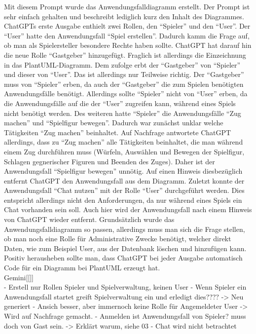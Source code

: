 Mit diesem Prompt wurde das Anwendungsfalldiagramm erstellt. Der Prompt ist sehr einfach gehalten und beschreibt lediglich kurz den Inhalt des Diagrammes.\\

ChatGPTs erste Ausgabe enthielt zwei Rollen, den ``Spieler'' und den ``User''. Der ``User'' hatte den Anwendungsfall ``Spiel erstellen''. Dadurch kamm die 
Frage auf, ob man als Spielersteller besondere Rechte haben sollte. ChatGPT hat darauf hin die neue Rolle ``Gastgeber'' hinzugefügt. Fraglich ist allerdings
die Einzeichnung in das PlantUML-Diagramm. Dem zufolge erbt der ``Gastgeber'' von ``Spieler'' und dieser von ``User''. Das ist allerdings nur Teilweise richtig.
Der ``Gastgeber'' muss von ``Spieler'' erben, da auch der ``Gastgeber'' die zum Spielen benötigten Anwendungsfälle benötigt. Allerdings sollte ``Spieler'' nicht 
von ``User'' erben, da die Anwendungsfälle auf die der ``User'' zugreifen kann, während eines Spiels nicht benötigt werden. Des weiteren hatte ``Spieler'' die 
Anwendungsfälle ``Zug machen'' und ``Spielfigur bewegen''. Dadurch war zunächst unklar welche Tätigkeiten ``Zug machen'' beinhaltet. Auf Nachfrage antwortete 
ChatGPT allerdings, dass zu ``Zug machen'' alle Tätigkeiten beinhaltet, die man während einem Zug durchführen muss (Würfeln, Auswählen und Bewegen der Spielfigur, 
Schlagen gegnerischer Figuren und Beenden des Zuges). Daher ist der Anwendungsfall ``Spielfigur bewegen'' unnötig. Auf einen Hinweis diesbezüglich entfernt ChatGPT 
den Anwendungsfall aus dem Diagramm. Zuletzt konnte der Anwendungsfall ``Chat nutzen'' mit der Rolle ``User'' durchgeführt werden. Dies entspricht allerdings nicht 
den Anforderungen, da nur während eines Spiels ein Chat vorhanden sein soll. Auch hier wird der Anwendungsfall nach einem Hinweis von ChatGPT wieder entfernt. 
Grundsätzlich wurde das Anwendungsfalldiagramm so passen, allerdings muss man sich die Frage stellen, ob man noch eine Rolle für Administrative Zwecke benötigt, 
welcher direkt Daten, wie zum Beispiel User, aus der Datenbank löschen und hinzufügen kann. Positiv herausheben sollte man, dass ChatGPT bei jeder Ausgabe 
automatisch Code für ein Diagramm bei PlantUML erzeugt hat.\\

Gemini[[]]\\
    - Erstell nur Rollen Spieler und Spielverwaltung, keinen User
    - Wenn Spieler ein Anwendungsfall startet greift Spielverwaltung ein und erledigt dies????
    -> Neu generiert
    - Ansich besser, aber immernoch keine Rolle für Angemeldeter User -> Wird auf Nachfrage gemacht.
    - Anmelden ist Anwendungsfall von Spieler? muss doch von Gast sein. -> Erklärt warum, siehe 03
    - Chat wird nicht betrachtet

